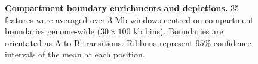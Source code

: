 \documentclass[a4paper,11pt,oneside]{book}
\begin{document}
\begin{figure}
\begin{center}
\captionsetup{width=\textwidth}
\caption[Compartment boundary enrichments and depletions.]{ {\bf Compartment boundary enrichments and depletions.}
35 features were averaged over 3 Mb windows centred on compartment boundaries genome-wide ($30 \times 100$ kb bins). Boundaries are orientated as A to B transitions. Ribbons represent $95\%$ confidence intervals of the mean at each position.
}\label{fig:allcompsorientated}
\end{center}
\end{figure} 

\clearpage




\ifstandalone
\begin{small}

\end{small}
\fi
\end{document}
